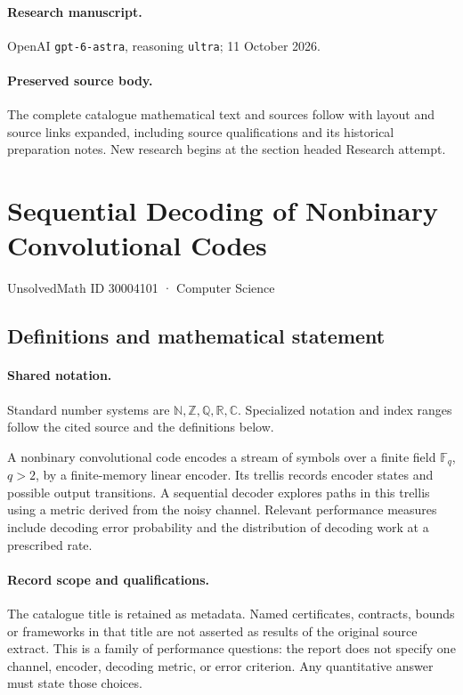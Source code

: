 \documentclass[11pt]{article}
\begin{document}
\paragraph{Research manuscript.} OpenAI \texttt{gpt-6-astra}, reasoning \texttt{ultra}; 11 October 2026.
\paragraph{Preserved source body.} The complete catalogue mathematical text and sources follow with layout and source links expanded, including source qualifications and its historical preparation notes. New research begins at the section headed Research attempt.

\section{Sequential Decoding of Nonbinary Convolutional Codes}\label{30004101}
{\small UnsolvedMath ID 30004101 · Computer Science}
\subsection{Definitions and mathematical statement}

\paragraph{Shared notation.}Standard number systems are $\mathbb N,\mathbb Z,\mathbb Q,\mathbb R,\mathbb C$. Specialized notation and index ranges follow the cited source and the definitions below.


A nonbinary convolutional code encodes a stream of symbols over a finite field $\mathbb F_q$, $q>2$, by a finite-memory linear encoder. Its trellis records encoder states and possible output transitions. A sequential decoder explores paths in this trellis using a metric derived from the noisy channel. Relevant performance measures include decoding error probability and the distribution of decoding work at a prescribed rate.
\paragraph{Record scope and qualifications.}
The catalogue title is retained as metadata. Named certificates, contracts, bounds or frameworks in that title are not asserted as results of the original source extract.
This is a family of performance questions: the report does not specify one channel, encoder, decoding metric, or error criterion. Any quantitative answer must state those choices.
\end{document}
